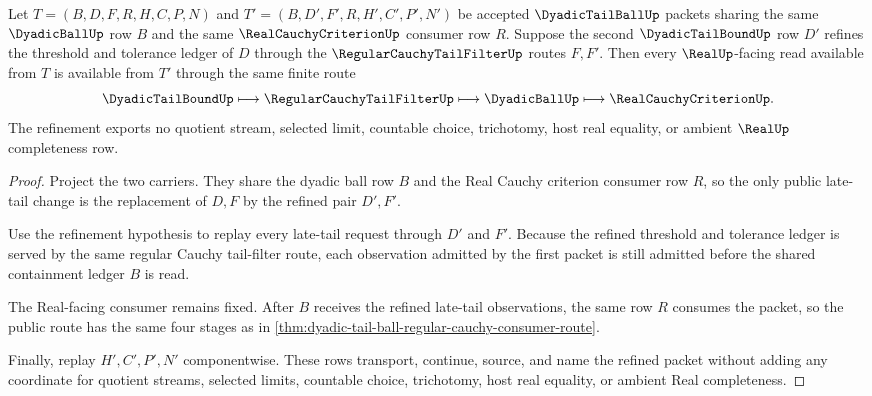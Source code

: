 \begin{theorem}
\label{thm:dyadic-tail-ball-window-stability}
Let $T=(B,D,F,R,H,C,P,N)$ and $T'=(B,D',F',R,H',C',P',N')$ be accepted $\DyadicTailBallUp$ packets sharing the same $\DyadicBallUp$ row $B$ and the same $\RealCauchyCriterionUp$ consumer row $R$. Suppose the second $\DyadicTailBoundUp$ row $D'$ refines the threshold and tolerance ledger of $D$ through the $\RegularCauchyTailFilterUp$ routes $F,F'$. Then every $\RealUp$-facing read available from $T$ is available from $T'$ through the same finite route
$$
\DyadicTailBoundUp \longmapsto \RegularCauchyTailFilterUp \longmapsto \DyadicBallUp \longmapsto \RealCauchyCriterionUp .
$$
The refinement exports no quotient stream, selected limit, countable choice, trichotomy, host real equality, or ambient $\RealUp$ completeness row.
\end{theorem}
\begin{proof}
Project the two carriers. They share the dyadic ball row $B$ and the Real Cauchy criterion consumer row $R$, so the only public late-tail change is the replacement of $D,F$ by the refined pair $D',F'$.

Use the refinement hypothesis to replay every late-tail request through $D'$ and $F'$. Because the refined threshold and tolerance ledger is served by the same regular Cauchy tail-filter route, each observation admitted by the first packet is still admitted before the shared containment ledger $B$ is read.

The Real-facing consumer remains fixed. After $B$ receives the refined late-tail observations, the same row $R$ consumes the packet, so the public route has the same four stages as in \autoref{thm:dyadic-tail-ball-regular-cauchy-consumer-route}.

Finally, replay $H',C',P',N'$ componentwise. These rows transport, continue, source, and name the refined packet without adding any coordinate for quotient streams, selected limits, countable choice, trichotomy, host real equality, or ambient Real completeness.
\end{proof}

